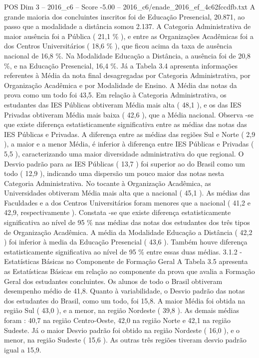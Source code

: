 \begin{textsample}{POS Dim 3 – 2016\_c6 – Score -5.00 – 2016\_c6/enade\_2016\_ef\_4c62fccdfb.txt}
A grande maioria dos concluintes inscritos foi de Educação Presencial, 20.871, ao passo que a modalidade a distância somou 2.137.
A Categoria Administrativa de maior ausência foi a Pública ( 21,1 \% ), e entre as Organizações Acadêmicas foi a dos Centros Universitários ( 18,6 \% ), que ficou acima da taxa de ausência nacional de 16,8 \%.
Na Modalidade Educação a Distância, a ausência foi de 20,8 \%, e na Educação Presencial, 16,4 \%.
Já a Tabela 3.4 apresenta informações referentes à Média da nota final desagregadas por Categoria Administrativa, por Organização Acadêmica e por Modalidade de Ensino.
A Média das notas da prova como um todo foi 43,5.
Em relação à Categoria Administrativa, os estudantes das IES Públicas obtiveram Média mais alta ( 48,1 ), e os das IES Privadas obtiveram Média mais baixa ( 42,6 ), que a Média nacional.
Observa -se que existe diferença estatisticamente significativa entre as médias das notas das IES Públicas e Privadas.
A diferença entre as médias das regiões Sul e Norte ( 2,9 ), a maior e a menor Média, é inferior à diferença entre IES Públicas e Privadas ( 5,5 ), caracterizando uma maior diversidade administrativa do que regional.
O Desvio padrão para as IES Públicas ( 13,7 ) foi superior ao do Brasil como um todo ( 12,9 ), indicando uma dispersão um pouco maior das notas nesta Categoria Administrativa.
No tocante à Organização Acadêmica, as Universidades obtiveram Média mais alta que a nacional ( 45,1 ).
As médias das Faculdades e a dos Centros Universitários foram menores que a nacional ( 41,2 e 42,9, respectivamente ).
Constata -se que existe diferença estatisticamente significativa ao nível de 95 \% nas médias das notas dos estudantes dos três tipos de Organização Acadêmica.
A média da Modalidade Educação a Distância ( 42,2 ) foi inferior à media da Educação Presencial ( 43,6 ).
Também houve diferença estatisticamente significativa ao nível de 95 \% entre essas duas médias. 3.1.2 - Estatísticas Básicas no Componente de Formação Geral A Tabela 3.5 apresenta as Estatísticas Básicas em relação ao componente da prova que avalia a Formação Geral dos estudantes concluintes.
Os alunos de todo o Brasil obtiveram desempenho médio de 41,8.
Quanto à variabilidade, o Desvio padrão das notas dos estudantes do Brasil, como um todo, foi 15,8.
A maior Média foi obtida na região Sul ( 43,0 ), e a menor, na região Nordeste ( 39,8 ).
As demais médias foram : 40,7 na região Centro-Oeste, 42,0 na região Norte e 42,1 na região Sudeste.
Já o maior Desvio padrão foi obtido na região Nordeste ( 16,0 ), e o menor, na região Sudeste ( 15,6 ).
As outras três regiões tiveram desvio padrão igual a 15,9.

\end{textsample}

